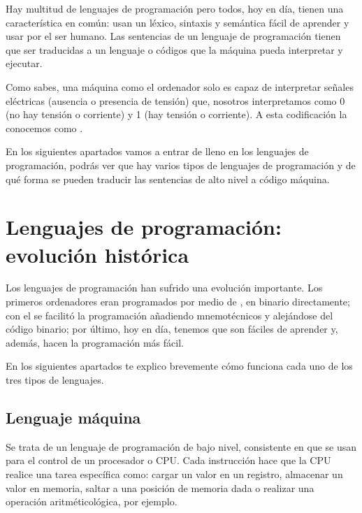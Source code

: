 \documentclass[letterpaper,10pt,spanish]{sphinxmanual}
\begin{document}
\sphinxAtStartPar
Hay multitud de lenguajes de programación pero todos, hoy en día, tienen una característica en común: usan un léxico, sintaxis y semántica fácil de aprender y usar por el ser humano. Las sentencias de un lenguaje de programación tienen que ser traducidas a un lenguaje o códigos que la máquina pueda interpretar y ejecutar.

\sphinxAtStartPar
Como sabes, una máquina como el ordenador solo es capaz de interpretar señales eléctricas (ausencia o presencia de tensión) que, nosotros interpretamos como 0 (no hay tensión o corriente) y 1 (hay tensión o corriente). A esta codificación la conocemos como .

\sphinxAtStartPar
En los siguientes apartados vamos a entrar de lleno en los lenguajes de programación, podrás ver que hay varios tipos de lenguajes de programación y de qué forma se pueden traducir las sentencias de alto nivel a código máquina.

\sphinxstepscope


\chapter{Lenguajes de programación: evolución histórica}
\label{\detokenize{lenguajes_programacion_evolucion_historica:lenguajes-de-programacion-evolucion-historica}}\label{\detokenize{lenguajes_programacion_evolucion_historica::doc}}
\sphinxAtStartPar
Los lenguajes de programación han sufrido una evolución importante. Los primeros ordenadores eran programados por medio de , en binario directamente; con el  se facilitó la programación añadiendo mnemotécnicos y alejándose del código binario; por último, hoy en día, tenemos  que son fáciles de aprender y, además, hacen la programación más fácil.

\sphinxAtStartPar
En los siguientes apartados te explico brevemente cómo funciona cada uno de los tres tipos de lenguajes.


\section{Lenguaje máquina}
\label{\detokenize{lenguajes_programacion_evolucion_historica:lenguaje-maquina}}
\sphinxAtStartPar
Se trata de un lenguaje de programación de bajo nivel, consistente en  que se usan para el control de un procesador o CPU. Cada instrucción hace que la CPU realice una tarea específica como: cargar un valor en un registro, almacenar un valor en memoria, saltar a una posición de memoria dada o realizar una operación aritmético\sphinxhyphen{}lógica, por ejemplo.
\end{document}
